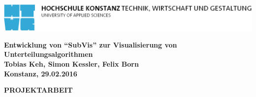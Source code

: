 \begin{titlepage}

\vspace*{-3.5cm}

\begin{flushleft}
\hspace*{-1cm} \includegraphics[width=15.7cm]{content/media/htwg-logo}
\end{flushleft}

\vspace{2.5cm}

\begin{center}
	\huge{
		\textbf{Entwicklung von \enquote{SubVis} zur Visualisierung von Unterteilungsalgorithmen} \\[5cm]
	}
	\Large{
		\textbf{Tobias Keh, Simon Kessler, Felix Born}} \\[6.5cm]
	\large{
		\textbf{Konstanz, 29.02.2016} \\[2.3cm]
	}
	
	\Huge{
		\textbf{{\sf PROJEKTARBEIT}}
	}
\end{center}

\end{titlepage}